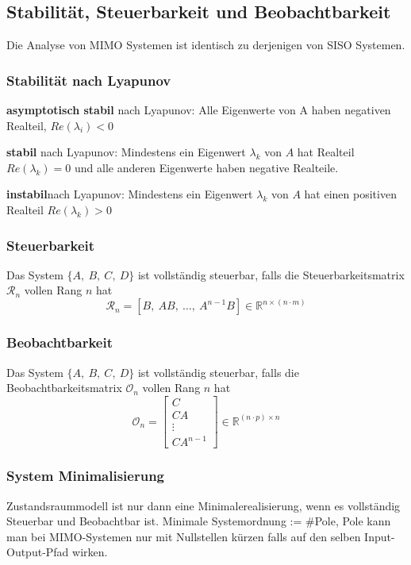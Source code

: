 \subsection{Stabilität, Steuerbarkeit und Beobachtbarkeit}
    Die Analyse von MIMO Systemen ist identisch zu derjenigen von SISO Systemen. 
    \subsubsection{Stabilität nach Lyapunov}
    \textbf{asymptotisch stabil} nach Lyapunov: 
    Alle Eigenwerte von A haben negativen Realteil, $Re(\lambda_i) < 0$
    
    \textbf{stabil} nach Lyapunov:
    Mindestens ein Eigenwert $\lambda_k$ von $A$ hat Realteil $Re(\lambda_k) = 0$ und alle anderen Eigenwerte haben negative Realteile.
    
    \textbf{instabil}nach Lyapunov:
    Mindestens ein Eigenwert $\lambda_k$ von $A$ hat einen positiven Realteil $Re(\lambda_k) > 0$
    
    \subsubsection{Steuerbarkeit}
        Das System $\{A,\ B,\ C,\ D\}$ ist vollständig steuerbar, falls die Steuerbarkeitsmatrix $\mathcal{R}_n$ vollen Rang $n$ hat
    \[\mathcal{R}_n = [B,\ AB,\ \dots,\ A^{n-1}B]\in \mathbb{R}^{n\times(n\cdot m)}\]
    
    \subsubsection{Beobachtbarkeit}
        Das System $\{A,\ B,\ C,\ D\}$ ist vollständig steuerbar, falls die Beobachtbarkeitsmatrix $\mathcal{O}_n$ vollen Rang $n$ hat
        \[\mathcal{O}_n = \begin{bmatrix} C\\ CA\\ \vdots\\ CA^{n-1}\end{bmatrix}\in \mathbb{R}^{(n\cdot p)\times n}\]
    \subsubsection{System Minimalisierung}
        Zustandsraummodell ist nur dann eine Minimalerealisierung, wenn es vollständig Steuerbar und Beobachtbar ist.
        Minimale Systemordnung := \#Pole, Pole kann man bei MIMO-Systemen nur mit Nullstellen kürzen falls auf den selben Input-Output-Pfad wirken.
        
        